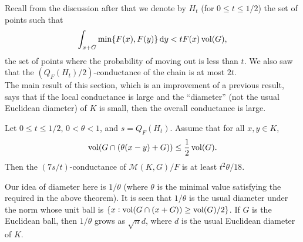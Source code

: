 Recall from the discussion after  that we denote by $H_t$ (for $0\leq t\leq 1/2$) the set of points such that
\[ \int_{x+G} \min\{F(x),F(y)\}\operatorname{d}\!{y} < tF(x)\operatorname{vol}(G), \]
the set of points where the probability of moving out is less than $t$.
We also saw that the $(Q_F(H_t)/2)$-conductance of the chain is at most $2t$.\\

The main result of this section, which is an improvement of a previous result, says that if the local conductance is large and the ``diameter'' (not the usual Euclidean diameter) of $K$ is small, then the overall conductance is large.

\begin{ftheo}
	\label{ftheo to bound conductance}
	Let $0\leq t\leq 1/2$, $0<\theta<1$, and $s=Q_F(H_t)$. Assume that for all $x,y\in K$,
	\begin{equation}
		\label{theo 4.40 eqn main}
		 \operatorname{vol}(G\cap (\theta(x-y)+G)) \leq \frac{1}{2}\operatorname{vol}(G).
	\end{equation}
	Then the $(7s/t)$-conductance of $\mathcal{M}(K,G)/F$ is at least $t^2\theta/18$.
\end{ftheo}

Our idea of diameter here is $1/\theta$ (where $\theta$ is the minimal value satisfying the required in the above theorem). It is seen that $1/\theta$ is the usual diameter under the norm whose unit ball is $\{x : \operatorname{vol}(G\cap(x+G))\geq\operatorname{vol}(G)/2\}$. If $G$ is the Euclidean ball, then $1/\theta$ grows as $\sqrt{n}d$, where $d$ is the usual Euclidean diameter of $K$.

